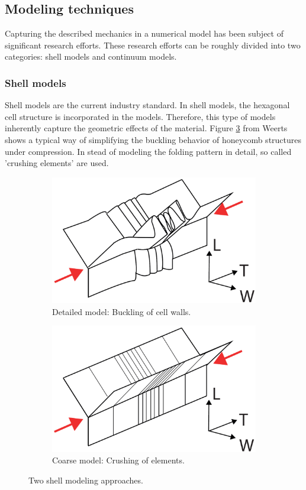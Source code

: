 \subsection{Modeling techniques}
Capturing the described mechanics in a numerical model has been subject of significant research efforts. These research efforts can be roughly divided into two categories: shell models and continuum models. 
\subsubsection{Shell models}
Shell models are the current industry standard. In shell models, the hexagonal cell structure is incorporated in the models. Therefore, this type of models inherently capture the geometric effects of the material. Figure \ref{Ch2_weerts} from Weerts \cite{weerts} shows a typical way of simplifying the buckling behavior of honeycomb structures under compression. In stead of modeling the folding pattern in detail, so called 'crushing elements' are used.
\begin{figure}[H]
    \centering
    \begin{subfigure}[b]{0.48\linewidth}
        \includegraphics[width=0.7\linewidth]{./Images/Ch2/Ch2_weerts_detailed.png}
        \caption{Detailed model: Buckling of cell walls.}
        \label{Ch2_weerts_detailed}
    \end{subfigure}
    \begin{subfigure}[b]{0.48\linewidth}
        \includegraphics[width=0.7\linewidth]{./Images/Ch2/Ch2_weerts_coarse.png}
         \caption{Coarse model: Crushing of elements.}
          \label{Ch2_weerts_coarse}
    \end{subfigure}
    \caption{Two shell modeling approaches. \cite{weerts}}
    \label{Ch2_weerts}
\end{figure}
